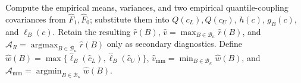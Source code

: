 Compute the empirical means, variances, and two empirical quantile-coupling covariances from \(\widehat F_1,\widehat F_0\); substitute them into \(Q(c_L),Q(c_U)\), \(h(c)\), \(g_B(c)\), and \(\ell_B(c)\).  Retain the resulting \(\widehat r(B)\), \(\widehat v=\max_{B\in\mathcal B_\kappa}\widehat r(B)\), and \(\widehat{\mathcal A}_R=\operatorname*{argmax}_{B\in\mathcal B_\kappa}\widehat r(B)\) only as secondary diagnostics.  Define \(\widehat w(B)=\max\{\widehat\ell_B(\widehat c_L),\widehat\ell_B(\widehat c_U)\}\), \(\widehat v_{\mathrm{mm}}=\min_{B\in\mathcal B_\kappa}\widehat w(B)\), and \(\widehat{\mathcal A}_{\mathrm{mm}}=\operatorname*{argmin}_{B\in\mathcal B_\kappa}\widehat w(B)\).